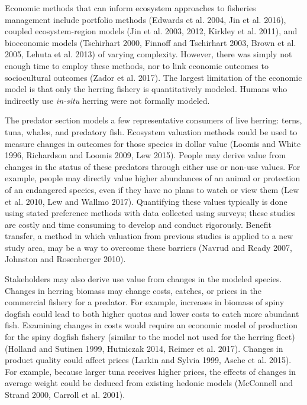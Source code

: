 \documentclass[]{article}
\begin{document}
Economic methods that can inform ecosystem approaches to fisheries
management include portfolio methods (Edwards et al. 2004, Jin et al.
2016), coupled ecosystem-region models (Jin et al. 2003, 2012, Kirkley
et al. 2011), and bioeconomic models (Tschirhart 2000, Finnoff and
Tschirhart 2003, Brown et al. 2005, Lehuta et al. 2013) of varying
complexity. However, there was simply not enough time to employ these
methods, nor to link economic outcomes to sociocultural outcomes (Zador
et al. 2017). The largest limitation of the economic model is that only
the herring fishery is quantitatively modeled. Humans who indirectly use
\textit{in-situ} herring were not formally modeled.

The predator section models a few representative consumers of live
herring: terns, tuna, whales, and predatory fish. Ecosystem valuation
methods could be used to measure changes in outcomes for those species
in dollar value (Loomis and White 1996, Richardson and Loomis 2009, Lew
2015). People may derive value from changes in the status of these
predators through either use or non-use values. For example, people may
directly value higher abundances of an animal or protection of an
endangered species, even if they have no plans to watch or view them
(Lew et al. 2010, Lew and Wallmo 2017). Quantifying these values
typically is done using stated preference methods with data collected
using surveys; these studies are costly and time consuming to develop
and conduct rigorously. Benefit transfer, a method in which valuation
from previous studies is applied to a new study area, may be a way to
overcome these barriers (Navrud and Ready 2007, Johnston and Rosenberger
2010).

Stakeholders may also derive use value from changes in the modeled
species. Changes in herring biomass may change costs, catches, or prices
in the commercial fishery for a predator. For example, increases in
biomass of spiny dogfish could lead to both higher quotas and lower
costs to catch more abundant fish. Examining changes in costs would
require an economic model of production for the spiny dogfish fishery
(similar to the model not used for the herring fleet) (Holland and
Sutinen 1999, Hutniczak 2014, Reimer et al. 2017). Changes in product
quality could affect prices (Larkin and Sylvia 1999, Asche et al. 2015).
For example, because larger tuna receives higher prices, the effects of
changes in average weight could be deduced from existing hedonic models
(McConnell and Strand 2000, Carroll et al. 2001).
\end{document}
